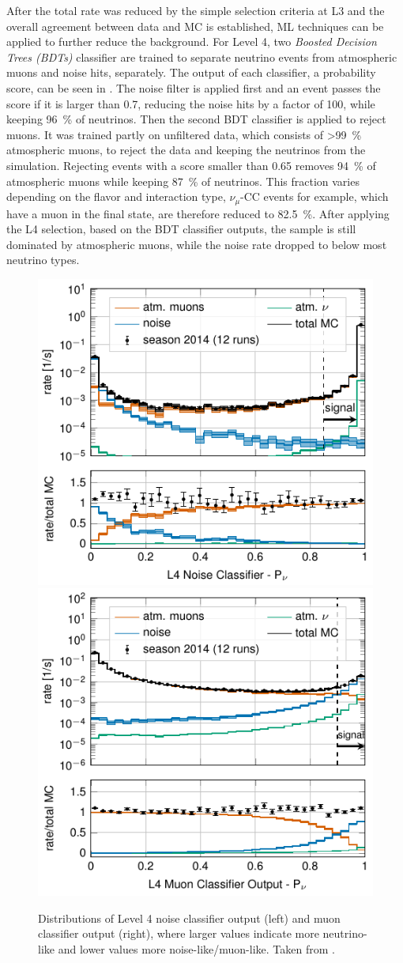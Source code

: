 After the total rate was reduced by the simple selection criteria at L3 and the overall agreement between data and MC is established, ML techniques can be applied to further reduce the background. For Level 4, two \textit{Boosted Decision Trees (BDTs)}  classifier are trained to separate neutrino events from atmospheric muons and noise hits, separately. The output of each classifier, a probability score, can be seen in . The noise filter is applied first and an event passes the score if it is larger than 0.7, reducing the noise hits by a factor of 100, while keeping \SI{96}{\percent} of neutrinos. Then the second BDT classifier is applied to reject muons. It was trained partly on unfiltered data, which consists of >\SI{99}{\percent} atmospheric muons, to reject the data and keeping the neutrinos from the simulation. Rejecting events with a score smaller than 0.65 removes \SI{94}{\percent} of atmospheric muons while keeping \SI{87}{\percent} of neutrinos. This fraction varies depending on the flavor and interaction type, $\nu_\mu$-CC events for example, which have a muon in the final state, are therefore reduced to \SI{82.5}{\percent}. After applying the L4 selection, based on the BDT classifier outputs, the sample is still dominated by atmospheric muons, while the noise rate dropped to below most neutrino types.

\begin{figure}
\centering 
\includegraphics[width=0.49\linewidth]{figures/simulation_and_processing/selection/l4_noise_classifier_probnu.pdf}
\includegraphics[width=0.49\linewidth]{figures/simulation_and_processing/selection/l4_muon_classifier_probnu.pdf}

\caption[Level 4 classifier outputs (muon and noise)]{Distributions of Level 4 noise classifier output (left) and muon classifier output (right), where larger values indicate more neutrino-like and lower values more noise-like/muon-like. Taken from \cite{OVS_PRD}.}
\end{figure}


